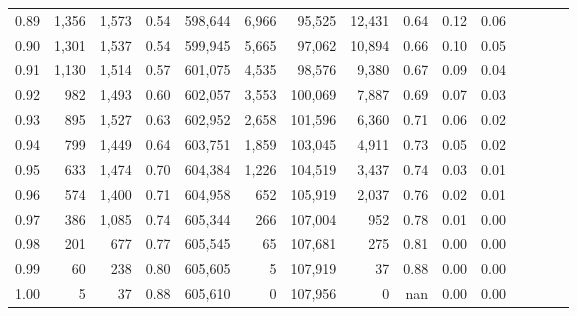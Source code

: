 \begin{tabular}{rrrcrrrrrrrrrrr}
0.89 &  1,356 &  1,573 &                                       0.54 &  598,644 &    6,966 &   95,525 &   12,431 &  0.64 &  0.12 &                         0.06 \\
0.90 &  1,301 &  1,537 &                                       0.54 &  599,945 &    5,665 &   97,062 &   10,894 &  0.66 &  0.10 &                         0.05 \\
0.91 &  1,130 &  1,514 &                                       0.57 &  601,075 &    4,535 &   98,576 &    9,380 &  0.67 &  0.09 &                         0.04 \\
0.92 &    982 &  1,493 &                                       0.60 &  602,057 &    3,553 &  100,069 &    7,887 &  0.69 &  0.07 &                         0.03 \\
0.93 &    895 &  1,527 &                                       0.63 &  602,952 &    2,658 &  101,596 &    6,360 &  0.71 &  0.06 &                         0.02 \\
0.94 &    799 &  1,449 &                                       0.64 &  603,751 &    1,859 &  103,045 &    4,911 &  0.73 &  0.05 &                         0.02 \\
0.95 &    633 &  1,474 &                                       0.70 &  604,384 &    1,226 &  104,519 &    3,437 &  0.74 &  0.03 &                         0.01 \\
0.96 &    574 &  1,400 &                                       0.71 &  604,958 &      652 &  105,919 &    2,037 &  0.76 &  0.02 &                         0.01 \\
0.97 &    386 &  1,085 &                                       0.74 &  605,344 &      266 &  107,004 &      952 &  0.78 &  0.01 &                         0.00 \\
0.98 &    201 &    677 &                                       0.77 &  605,545 &       65 &  107,681 &      275 &  0.81 &  0.00 &                         0.00 \\
0.99 &     60 &    238 &                                       0.80 &  605,605 &        5 &  107,919 &       37 &  0.88 &  0.00 &                         0.00 \\
1.00 &      5 &     37 &                                       0.88 &  605,610 &        0 &  107,956 &        0 &   nan &  0.00 &                         0.00 \\
\bottomrule
\end{tabular}
